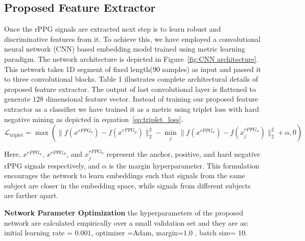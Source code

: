 \subsection{Proposed Feature Extractor}
Once the rPPG signals are extracted next step is to learn robust and discriminative features from it. To achieve this, we have employed a convolutional neural network (CNN) based embedding model trained using metric learning paradigm. The network architecture is depicted in Figure~\ref{fig:CNN architecture}. This network takes 1D segment of fixed length($90$ samples) as input and passed it to three convolutional blocks. Table 1 illustrates complete architectural details of proposed feature extractor. The output of last convolutional layer is flattened to generate $128$ dimensional feature vector. Instead of training our proposed feature extractor as a classifier we have trained it as a metric using triplet loss with hard negative mining as depicted in equation~\ref{eq:triplet_loss}.
\begin{equation}
\mathcal{L}_{\text{triplet}} = \max \left( \|f(x^{rPPG_a}) - f(x^{rPPG_p})\|_2^2 - \min_j \|f(x^{rPPG_a}) - f(x^{rPPG_n}_j)\|_2^2 + \alpha, 0 \right)
\label{eq:triplet_loss}
\end{equation}

Here, \( x^{rPPG_a} \), \( x^{rPPG_P} \), and \( x^{rPPG_n}_j \) represent the anchor, positive, and hard negative rPPG signals  respectively, and \( \alpha \) is the margin hyperparameter. This formulation encourages the network to learn embeddings such that signals from the same subject are closer in the embedding space, while signals from different subjects are farther apart.

\textbf{Network Parameter Optimization} the hyperparameters of the proposed network are calculated empirically over a small validation set and they are as: initial learning rate = $0.001$, optimizer =Adam, margin=$1.0$ , batch size= $10$.

